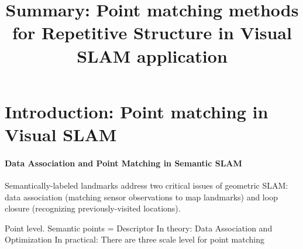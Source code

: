 \documentclass[review]{elsarticle}
\begin{document}
\begin{frontmatter}

\title{Summary: Point matching methods for Repetitive Structure in Visual SLAM application}






\begin{abstract}
\end{abstract}

\begin{keyword}
\end{keyword}

\end{frontmatter}

\linenumbers

\section{Introduction: Point matching in Visual SLAM}

\paragraph{Data Association and Point Matching in Semantic SLAM} 
Semantically-labeled landmarks address two critical issues of geometric SLAM: data association (matching sensor observations to map landmarks) and loop closure (recognizing previously-visited locations).

Point level.
Semantic points = Descriptor
In theory: Data Association and Optimization
In practical: There are three scale level for point matching
\end{document}
